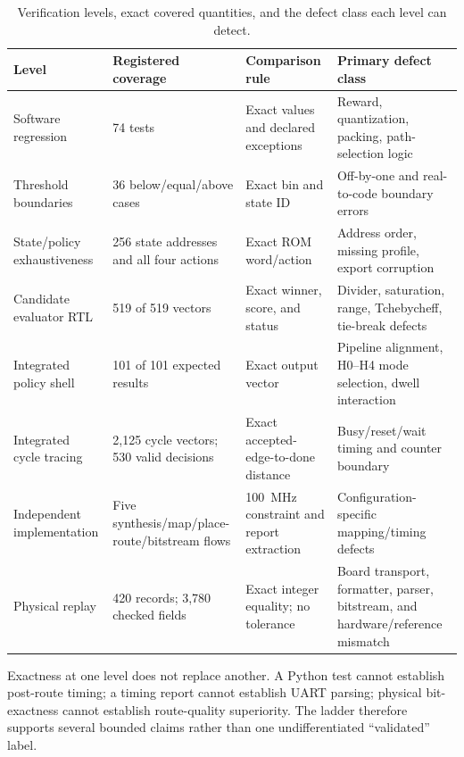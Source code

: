 \begin{landscape}
\begin{table}[p]
\centering
\small
\caption{Verification levels, exact covered quantities, and the defect class each
level can detect.}
\label{tab:verification-coverage-matrix}
\begin{tabularx}{\linewidth}{@{}p{3.0cm}p{4.6cm}p{3.8cm}X@{}}
\toprule
\textbf{Level} & \textbf{Registered coverage} & \textbf{Comparison rule} &
\textbf{Primary defect class}\\
\midrule
Software regression & 74 tests & Exact values and declared exceptions & Reward,
quantization, packing, path-selection logic\\
Threshold boundaries & 36 below/equal/above cases & Exact bin and state ID &
Off-by-one and real-to-code boundary errors\\
State/policy exhaustiveness & 256 state addresses and all four actions & Exact ROM
word/action & Address order, missing profile, export corruption\\
Candidate evaluator RTL & 519 of 519 vectors & Exact winner, score, and status &
Divider, saturation, range, Tchebycheff, tie-break defects\\
Integrated policy shell & 101 of 101 expected results & Exact output vector &
Pipeline alignment, H0--H4 mode selection, dwell interaction\\
Integrated cycle tracing & 2,125 cycle vectors; 530 valid decisions & Exact
accepted-edge-to-done distance & Busy/reset/wait timing and counter boundary\\
Independent implementation & Five synthesis/map/place-route/bitstream flows &
100~MHz constraint and report extraction & Configuration-specific mapping/timing defects\\
Physical replay & 420 records; 3,780 checked fields & Exact integer equality; no
tolerance & Board transport, formatter, parser, bitstream, and hardware/reference mismatch\\
\bottomrule
\end{tabularx}
\end{table}
\end{landscape}

Exactness at one level does not replace another. A Python test cannot establish
post-route timing; a timing report cannot establish UART parsing; physical
bit-exactness cannot establish route-quality superiority. The ladder therefore
supports several bounded claims rather than one undifferentiated ``validated''
label.

